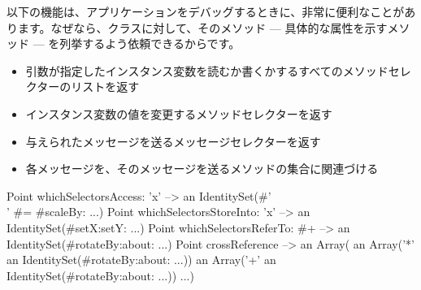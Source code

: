 \documentclass[a4paper,10pt,twoside]{book}
\begin{document}
以下の機能は、アプリケーションをデバッグするときに、非常に便利なことがあります。なぜなら、クラスに対して、そのメソッド --- 具体的な属性を示すメソッド --- を列挙するよう依頼できるからです。
\begin{itemize}
\item {} 引数が指定したインスタンス変数を読むか書くかするすべてのメソッドセレクターのリストを返す %
\item {} インスタンス変数の値を変更するメソッドセレクターを返す
\item {} 与えられたメッセージを送るメッセージセレクターを返す
\item {} 各メッセージを、そのメッセージを送るメソッドの集合に関連づける %
\end{itemize}

\begin{code}{} %
Point whichSelectorsAccess: 'x'    --> an IdentitySet(#'\\' #= #scaleBy: ...)
Point whichSelectorsStoreInto: 'x' --> an IdentitySet(#setX:setY: ...)
Point whichSelectorsReferTo: #+  --> an IdentitySet(#rotateBy:about: ...)
Point crossReference --> an Array(
		an Array('*' an IdentitySet(#rotateBy:about: ...))
		an Array('+' an IdentitySet(#rotateBy:about: ...))
		...)
\end{code}
\end{document}
